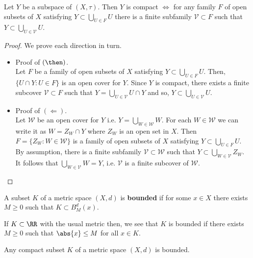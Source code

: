 \documentclass[12pt, a4paper]{article}
\begin{document}
\begin{mdlemma}
    Let \(Y\) be a subspace of \((X,\tau)\). Then \(Y\) is compact \(\iff\) for any family \(F\) of open subsets of \(X\) satisfying \(Y \subset \bigcup_{U \in F} U\) there is a finite subfamily \(\mathcal{V} \subset F\) such that \(Y \subset \bigcup_{U \in \mathcal{V}} U\).
\end{mdlemma}

\begin{proof}
    We prove each direction in turn.
    \begin{itemize}
        \item Proof of \((\then)\). \\
        Let \(F\) be a family of open subsets of \(X\) satisfying \(Y \subset \bigcup_{U \in F} U\). Then, \(\{U\cap Y: U \in F\}\) is an open cover for \(Y\). Since \(Y\) is compact, there exists a finite subcover \(\mathcal{V} \subset F\) such that \(Y = \bigcup_{U \in \mathcal{V}} U\cap Y\) and so, \(Y \subset \bigcup_{U \in \mathcal{V}} U\).
        \item Proof of \((\Leftarrow)\). \\
        Let \(\mathcal{W}\) be an open cover for \(Y\) i.e. \(Y =\bigcup_{W \in \mathcal{W}} W\). For each \(W \in \mathcal{W}\) we can write it as \(W =Z_W \cap Y\) where \(Z_W\) is an open set in \(X\). Then \(F = \{Z_W : W\in \mathcal{W}\}\) is a family of open subsets of \(X\) satisfying \(Y \subset \bigcup_{U \in F} U\). By assumption, there is a finite subfamily \(\mathcal{V} \subset \mathcal{W}\) such that \(Y \subset \bigcup_{W \in \mathcal{V}} Z_W\). It follows that \(\bigcup_{W \in \mathcal{V}} W =Y\), i.e. \(\mathcal{V}\) is a finite subcover of \(\mathcal{W}\).
    \end{itemize}
\end{proof}

\begin{definition}
    A subset \(K\) of a metric space \((X,d)\) is \textbf{bounded} if for some \(x \in X\) there exists \(M \geq 0\) such that \(K \subset B_M^d(x)\).
\end{definition}

\begin{example}
    If \(K \subset \RR\) with the usual metric then, we see that \(K\) is bounded if there exists \(M\geq 0\) such that \(\abs{x}\leq M\) for all \(x \in K\).
\end{example}

\begin{theorem}
    Any compact subset \(K\) of a metric space \((X,d)\) is bounded.
\end{theorem}
\end{document}
